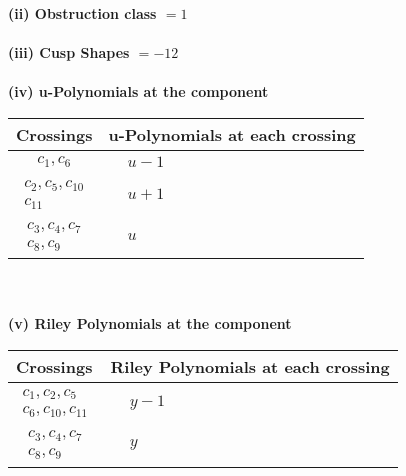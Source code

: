 \documentclass[1p]{elsarticle_modified}
\theoremstyle{definition}
\begin{document}
\flushleft \textbf{(ii) Obstruction class $= 1$}\\~\\
\flushleft \textbf{(iii) Cusp Shapes $= -12$}\\~\\
\newpage\renewcommand{\arraystretch}{1}
\flushleft \textbf{(iv) u-Polynomials at the component}\newline \\
\begin{tabular}{m{50pt}|m{274pt}}
Crossings & \hspace{64pt}u-Polynomials at each crossing \\
\hline $$\begin{aligned}c_{1},c_{6}\end{aligned}$$&$\begin{aligned}
&u-1
\end{aligned}$\\
\hline $$\begin{aligned}c_{2},c_{5},c_{10}\\c_{11}\end{aligned}$$&$\begin{aligned}
&u+1
\end{aligned}$\\
\hline $$\begin{aligned}c_{3},c_{4},c_{7}\\c_{8},c_{9}\end{aligned}$$&$\begin{aligned}
&u
\end{aligned}$\\
\hline
\end{tabular}\\~\\
\newpage\renewcommand{\arraystretch}{1}
\flushleft \textbf{(v) Riley Polynomials at the component}\newline \\
\begin{tabular}{m{50pt}|m{274pt}}
Crossings & \hspace{64pt}Riley Polynomials at each crossing \\
\hline $$\begin{aligned}c_{1},c_{2},c_{5}\\c_{6},c_{10},c_{11}\end{aligned}$$&$\begin{aligned}
&y-1
\end{aligned}$\\
\hline $$\begin{aligned}c_{3},c_{4},c_{7}\\c_{8},c_{9}\end{aligned}$$&$\begin{aligned}
&y
\end{aligned}$\\
\hline
\end{tabular}\\~\\
\end{document}
